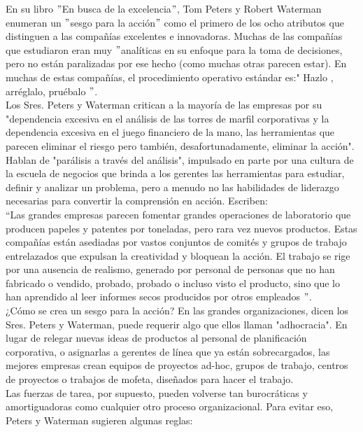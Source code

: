 \documentclass[10pt]{book}
\begin{document}
En su libro $"$En busca de la excelencia$"$, Tom Peters y Robert Waterman enumeran un $"$sesgo para la acción$"$ como el primero de los ocho atributos que distinguen a las compañías excelentes e innovadoras. Muchas de las compañías que estudiaron eran muy $"$analíticas en su enfoque para la toma de decisiones, pero no están paralizadas por ese hecho (como muchas otras parecen estar). En muchas de estas compañías, el procedimiento operativo estándar es:" Hazlo , arréglalo, pruébalo $"$.\\
Los Sres. Peters y Waterman critican a la mayoría de las empresas por su "dependencia excesiva en el análisis de las torres de marfil corporativas y la dependencia excesiva en el juego financiero de la mano, las herramientas que parecen eliminar el riesgo pero también, desafortunadamente, eliminar la acción". Hablan de "parálisis a través del análisis", impulsado en parte por una cultura de la escuela de negocios que brinda a los gerentes las herramientas para estudiar, definir y analizar un problema, pero a menudo no las habilidades de liderazgo necesarias para convertir la comprensión en acción. Escriben:\\
$“$Las grandes empresas parecen fomentar grandes operaciones de laboratorio que producen papeles y patentes por toneladas, pero rara vez nuevos productos. Estas compañías están asediadas por vastos conjuntos de comités y grupos de trabajo entrelazados que expulsan la creatividad y bloquean la acción. El trabajo se rige por una ausencia de realismo, generado por personal de personas que no han fabricado o vendido, probado, probado o incluso visto el producto, sino que lo han aprendido al leer informes secos producidos por otros empleados $"$.\\
¿Cómo se crea un sesgo para la acción? En las grandes organizaciones, dicen los Sres. Peters y Waterman, puede requerir algo que ellos llaman "adhocracia". En lugar de relegar nuevas ideas de productos al personal de planificación corporativa, o asignarlas a gerentes de línea que ya están sobrecargados, las mejores empresas crean equipos de proyectos ad-hoc, grupos de trabajo, centros de proyectos o trabajos de mofeta, diseñados para hacer el trabajo.\\
Las fuerzas de tarea, por supuesto, pueden volverse tan burocráticas y amortiguadoras como cualquier otro proceso organizacional. Para evitar eso, Peters y Waterman sugieren algunas reglas:
\end{document}
